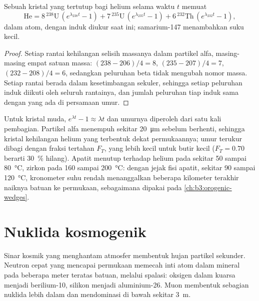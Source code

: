 \begin{theorem}\label{thm:b3:advanced-geochronology:helium}
Sebuah kristal yang tertutup bagi helium selama waktu $t$ memuat
\[
\mathrm{He} = 8\,{}^{238}\mathrm U\,(e^{\lambda_{238}t} - 1)
+ 7\,{}^{235}\mathrm U\,(e^{\lambda_{235}t} - 1)
+ 6\,{}^{232}\mathrm{Th}\,(e^{\lambda_{232}t} - 1),
\]
dalam atom, dengan induk diukur saat ini; samarium-147 menambahkan suku kecil.
\end{theorem}

\begin{proof}
Setiap rantai kehilangan selisih massanya dalam partikel alfa, masing-masing empat satuan massa:
$(238 - 206)/4 = 8$, $(235 - 207)/4 = 7$, $(232 - 208)/4 = 6$, sedangkan peluruhan
beta tidak mengubah nomor massa. Setiap rantai berada dalam kesetimbangan sekuler,
sehingga setiap peluruhan induk diikuti oleh seluruh rantainya, dan jumlah
peluruhan tiap induk sama dengan yang ada di persamaan umur.
\end{proof}

Untuk kristal muda, $e^{\lambda t} - 1 \approx \lambda t$ dan umurnya diperoleh
dari satu kali pembagian. Partikel alfa menempuh sekitar
\qty{20}{\micro\metre} sebelum berhenti, sehingga kristal kehilangan helium yang terbentuk
dekat permukaannya; umur terukur dibagi dengan fraksi tertahan $F_T$,
yang lebih kecil untuk butir kecil ($F_T = 0.70$ berarti \qty{30}{\percent}
hilang). Apatit menutup terhadap helium pada sekitar 50 sampai \qty{80}{\celsius}, zirkon pada
160 sampai \qty{200}{\celsius}: dengan jejak fisi apatit, sekitar 90 sampai
\qty{120}{\celsius}, kronometer suhu rendah menanggalkan
beberapa kilometer terakhir naiknya batuan ke permukaan, sebagaimana
dipakai pada \cref{ch:b3:orogenic-wedges}.

\section{Nuklida kosmogenik}\label{sec:b3:advanced-geochronology:cosmogenic}

Sinar kosmik yang menghantam atmosfer membentuk hujan partikel sekunder. Neutron
cepat yang mencapai permukaan memecah inti atom dalam mineral pada
beberapa meter teratas batuan, melalui spalasi: oksigen dalam kuarsa menjadi berilium-10, silikon
menjadi aluminium-26. Muon membentuk sebagian nuklida lebih dalam dan mendominasi di bawah
sekitar \qty{3}{m}.

